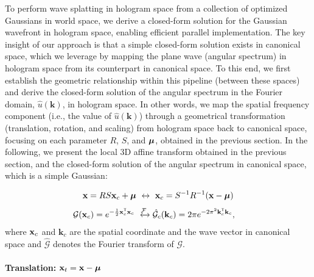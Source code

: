 To perform wave splatting in hologram space from a collection of optimized Gaussians in world space, we derive a closed-form solution for the Gaussian wavefront in hologram space, enabling efficient parallel implementation. The key insight of our approach is that a simple closed-form solution exists in canonical space, which we leverage by mapping the plane wave (angular spectrum) in hologram space from its counterpart in canonical space. To this end, we first establish the geometric relationship within this pipeline (between these spaces) and derive the closed-form solution of the angular spectrum in the Fourier domain, $\hat{u} (\mathbf{k})$, in hologram space. In other words, we map the spatial frequency component (i.e., the value of $\hat{u} (\mathbf{k})$) through a geometrical transformation (translation, rotation, and scaling) from hologram space back to canonical space, focusing on each parameter $R$, $S$, and ${\bm{\mu}}$, obtained in the previous section. In the following, we present the local 3D affine transform obtained in the previous section, and the closed-form solution of the angular spectrum in canonical space, which is a simple Gaussian:


\begin{align}
    \mathbf{x} = RS \mathbf{x}_c + {\bm{\mu}} \,\, \leftrightarrow \,\, \mathbf{x}_c = S^{-1}R^{-1}( \mathbf{x} - {\bm{\mu}}) 
\end{align}
\begin{align}
  \mathcal{G} (\coordinate_c) &= e^{-\frac{1}{2} \coordinate_c^\mathsf{T}\coordinate_c }  \xleftrightarrow{\fourier} \hat{\mathcal{G}}_c(\mathbf{k}_c) = 2 \pi e^{-2\pi^2 \mathbf{k}_c^\mathsf{T} \mathbf{k}_c},
\end{align}
where $\mathbf{x}_c$ and $\mathbf{k}_c$ are the spatial coordinate and the wave vector in canonical space and $\hat{\mathcal{G}}$ denotes the Fourier transform of $\mathcal{G}$.

\paragraph{\textbf{Translation: $\mathbf{x}_t = \mathbf{x} - {\bm{\mu}}$}}

